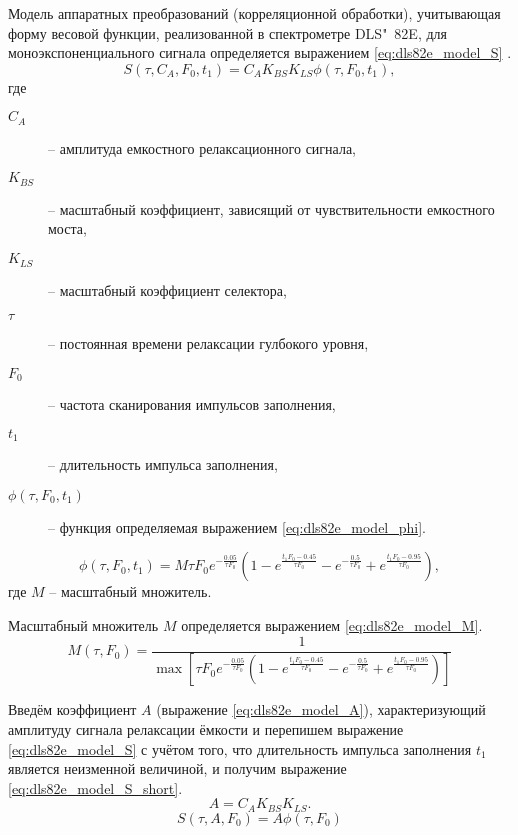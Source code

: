     Модель аппаратных преобразований (корреляционной обработки),
    учитывающая форму весовой функции, реализованной в спектрометре
    DLS"~82E, для моноэкспоненциального сигнала определяется выражением
    \ref{eq:dls82e_model_S} \cite{rp_vak}.
    \begin{equation}
        \label{eq:dls82e_model_S}
        S\left(\tau,C_A,F_0, t_1\right) = C_A K_{BS} K_{LS} 
        \phi\left(\tau,F_0,t_1\right),
    \end{equation}
    где
    \begin{description}
        \item[$C_A$] -- амплитуда емкостного релаксационного сигнала,
        \item[$K_{BS}$] -- масштабный коэффициент, зависящий от 
        чувствительности емкостного моста,
        \item[$K_{LS}$] -- масштабный коэффициент селектора,
        \item[$\tau$] -- постоянная времени релаксации гулбокого уровня,
        \item[$F_0$] -- частота сканирования импульсов заполнения,
        \item[$t_1$] -- длительность импульса заполнения,
        \item[$\phi\left(\tau,F_0,t_1\right)$] -- функция определяемая
        выражением \ref{eq:dls82e_model_phi}.
    \end{description}
    \begin{equation}
        \label{eq:dls82e_model_phi}
        \phi\left(\tau,F_0,t_1\right) = 
        M \tau F_0 e^{-\frac{0.05}{\tau F_0}}
        \left(1-e^{\frac{t_1 F_0-0.45}{\tau F_0}}
        -e^{-\frac{0.5}{\tau F_0}}+
        e^{\frac{t_1 F_0-0.95}{\tau F_0}}\right),
    \end{equation}
    где $M$ -- масштабный множитель.

    Масштабный множитель $M$ определяется выражением
    \ref{eq:dls82e_model_M}.
    \begin{equation}
        \label{eq:dls82e_model_M}
        M(\tau, F_0) = \frac{1}{\max{\left[
        \tau F_0 e^{-\frac{0.05}{\tau F_0}}
        \left(1-e^{\frac{t_1 F_0-0.45}{\tau F_0}}
        -e^{-\frac{0.5}{\tau F_0}}+
        e^{\frac{t_1 F_0-0.95}{\tau F_0}}\right)
        \right]}}
    \end{equation}

    Введём коэффициент $A$ (выражение \ref{eq:dls82e_model_A}), 
    характеризующий амплитуду сигнала релаксации ёмкости и перепишем 
    выражение \ref{eq:dls82e_model_S} с учётом того, что длительность
    импульса заполнения $t_1$ является неизменной величиной, и получим
    выражение \ref{eq:dls82e_model_S_short}.
    \begin{equation}
        \label{eq:dls82e_model_A}
        A = C_A K_{BS} K_{LS}.
    \end{equation}
    \begin{equation}
        \label{eq:dls82e_model_S_short}
        S(\tau,A,F_0) = A\phi(\tau, F_0)
    \end{equation}

